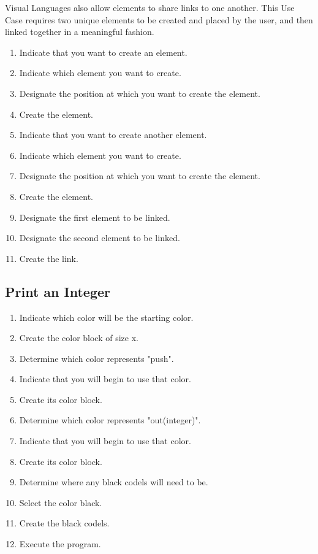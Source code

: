 Visual Languages also allow elements to share links to one another. This
Use Case requires two unique elements to be created and placed by the user,
and then linked together in a meaningful fashion.

\begin{enumerate}
  \item Indicate that you want to create an element.
  \item Indicate which element you want to create.
  \item Designate the position at which you want to create the element.
  \item Create the element.
  \item Indicate that you want to create another element.
  \item Indicate which element you want to create.
  \item Designate the position at which you want to create the element.
  \item Create the element.
  \item Designate the first element to be linked.
  \item Designate the second element to be linked.
  \item Create the link.
\end{enumerate}

\subsection{Print an Integer}

\begin{enumerate}
  \item Indicate which color will be the starting color.
  \item Create the color block of size x.
  \item Determine which color represents "push".
  \item Indicate that you will begin to use that color.
  \item Create its color block.
  \item Determine which color represents "out(integer)".
  \item Indicate that you will begin to use that color.
  \item Create its color block.
  \item Determine where any black codels will need to be.
  \item Select the color black.
  \item Create the black codels.
  \item Execute the program.
\end{enumerate}

